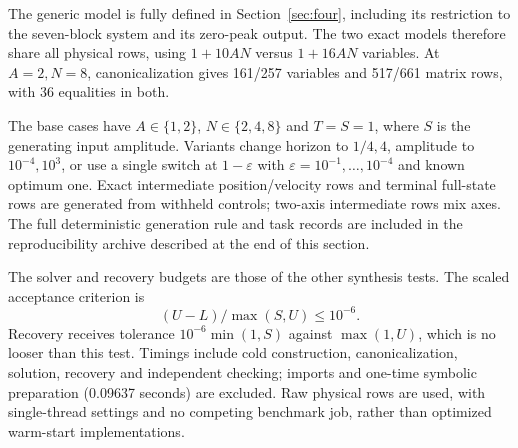 \documentclass[pdflatex,sn-mathphys-num]{sn-jnl}
\theoremstyle{thmstyleone}
\theoremstyle{thmstyletwo}\newtheorem{remark}[theorem]{Remark}
\begin{document}
The generic model is fully defined in Section~\ref{sec:four}, including its
restriction to the seven-block system and its zero-peak output. The two
exact models therefore share all physical rows, using
$1+10AN$ versus $1+16AN$ variables. At $A=2,N=8$, canonicalization gives
161/257 variables and 517/661 matrix rows, with 36 equalities in both.

The base cases have $A\in\{1,2\}$, $N\in\{2,4,8\}$ and $T=S=1$,
where $S$ is the generating input amplitude. Variants change horizon to
$1/4,4$, amplitude to $10^{-4},10^3$, or use a single switch at
$1-\varepsilon$ with $\varepsilon=10^{-1},\ldots,10^{-4}$ and known optimum
one. Exact intermediate position/velocity rows and terminal full-state rows
are generated from withheld controls; two-axis intermediate rows mix axes.
The full deterministic generation rule and task records are included in
the reproducibility archive described at the end of this section.

The solver and recovery budgets are those of the other synthesis tests.
The scaled acceptance criterion is
\begin{equation}\label{eq:matched-tolerance}
 (U-L)/\max(S,U)\le10^{-6}.
\end{equation}
Recovery receives tolerance $10^{-6}\min(1,S)$ against $\max(1,U)$,
which is no looser than this test. Timings include cold construction,
canonicalization, solution, recovery and independent checking; imports and
one-time symbolic preparation (0.09637 seconds) are excluded.
Raw physical rows are used, with single-thread settings and no competing
benchmark job, rather than optimized warm-start implementations.
\end{document}
